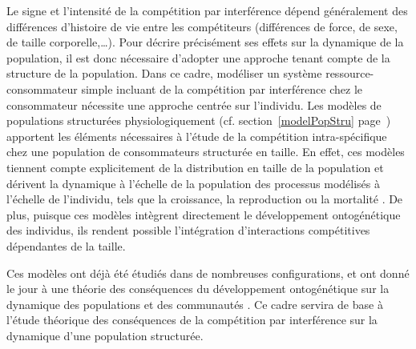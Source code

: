 Le signe et l'intensité de la compétition par interférence dépend généralement
des différences d'histoire de vie entre les compétiteurs (différences de force,
de sexe, de taille corporelle,\ldots). Pour décrire précisément ses effets sur
la dynamique de la population, il est donc nécessaire d'adopter une approche
tenant compte de la structure de la population. Dans ce cadre, modéliser un système ressource-consommateur simple
incluant de la compétition par interférence chez le consommateur nécessite une
approche centrée sur l'individu. Les modèles de populations structurées
physiologiquement (cf.
section~\ref{modelPopStru} page~\pageref{modelPopStru}) apportent les éléments
nécessaires à l'étude de la compétition intra-spécifique chez une population de
consommateurs structurée en taille. En effet, ces modèles tiennent compte
explicitement de la distribution en taille de la population et dérivent la
dynamique à l'échelle de la population des processus modélisés à l'échelle de
l'individu, tels que la croissance, la reproduction ou la mortalité
\autocites{kooijman1984a, metz1986a, de-roos1997a}. De plus, puisque ces modèles
intègrent directement le développement ontogénétique des individus, ils rendent
possible l'intégration d'interactions compétitives dépendantes de la taille.

Ces modèles ont déjà été
étudiés dans de nombreuses configurations, et ont donné le jour à une théorie
des conséquences du développement ontogénétique sur la dynamique des populations
et des communautés \autocites{de-roos2012a}. Ce cadre servira de base
à l'étude théorique des conséquences de la compétition par interférence sur la
dynamique d'une population structurée. 
